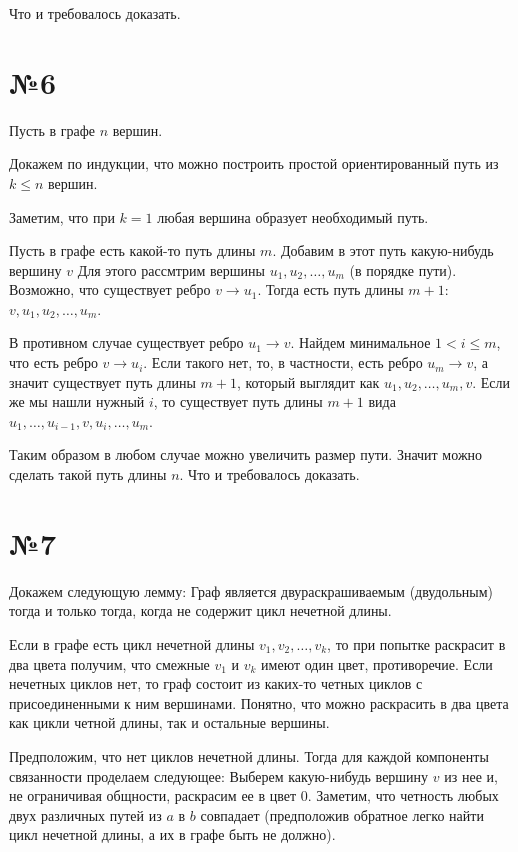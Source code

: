\documentclass[12pt]{article}
\begin{document}
	Что и требовалось доказать.	 
	
	\section*{№6}

	Пусть в графе $n$ вершин.	
	
	Докажем по индукции, что можно построить простой ориентированный путь из $k \leqslant n$ вершин.
	
	Заметим, что при $k = 1$ любая вершина образует необходимый путь.
	
	Пусть в графе есть какой-то путь длины $m$. Добавим в этот путь какую-нибудь вершину $v$
	Для этого рассмтрим вершины $u_1, u_2, \dots, u_m$ (в порядке пути). 
	Возможно, что существует ребро $v \rightarrow u_1$. 
	Тогда есть путь длины $m + 1$: $v, u_1, u_2, \dots, u_m$.
	
	В противном случае существует ребро $u_1 \rightarrow v$. 
	Найдем минимальное $1 < i \leqslant m$, что есть ребро $v \rightarrow u_i$. 
	Если такого нет, то, в частности, есть ребро $u_m \rightarrow v$, 
	а значит существует путь длины $m + 1$, который выглядит как
	$u_1, u_2, \dots, u_m, v$. 
	Если же мы нашли нужный $i$, то существует путь длины $m + 1$ вида
	$u_1, \dots, u_{i-1}, v, u_i, \dots, u_m$.
	
	Таким образом в любом случае можно увеличить размер пути. Значит можно сделать такой путь длины $n$.
	Что и требовалось доказать.
	
	\section*{№7}
	
	Докажем следующую лемму: Граф является двураскрашиваемым (двудольным) тогда и только тогда, когда не содержит цикл нечетной длины.
	
	Если в графе есть цикл нечетной длины $v_1, v_2, \dots, v_k$, 
	то при попытке раскрасит в два цвета получим, что смежные $v_1$ и $v_k$ имеют один цвет, противоречие.
	Если нечетных циклов нет, то граф состоит из каких-то четных циклов с присоединенными к ним вершинами.
	Понятно, что можно раскрасить в два цвета как цикли четной длины, так и остальные вершины.
	
	Предположим, что нет циклов нечетной длины. 
	Тогда для каждой компоненты связанности проделаем следующее:
	Выберем какую-нибудь вершину $v$  из нее и, не ограничивая общности, раскрасим ее в цвет $0$.	
	Заметим, что четность любых двух различных путей из $a$ в $b$ совпадает 
	(предположив обратное легко найти цикл нечетной длины, а их в графе быть не должно).
	
\end{document}
